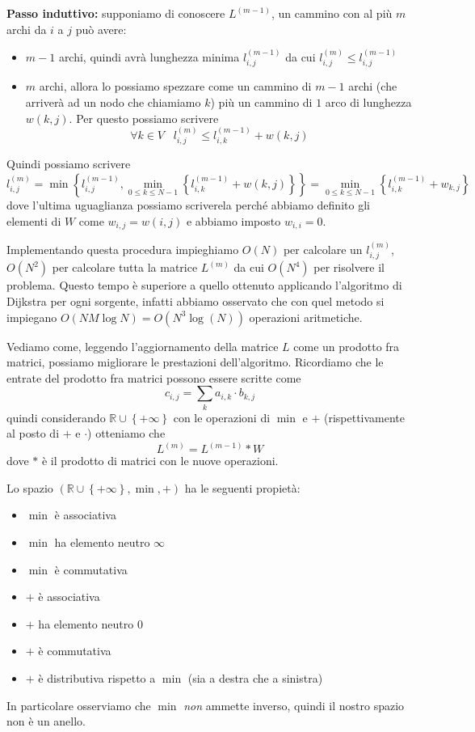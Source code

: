 \documentclass[a4paper,10pt]{amsbook}
\theoremstyle{plain}
\theoremstyle{definition}
\theoremstyle{remark}
\newcommand{\set}[1]{\left\{#1\right\}}
\newcommand{\pa}[1]{\left(#1\right)}
\begin{document}
\textbf{Passo induttivo:} supponiamo di conoscere $L^{(m-1)}$, un
cammino con al più $m$ archi da $i$ a $j$ può avere:
\begin{itemize}
\item $m-1$ archi, quindi avrà lunghezza minima $l^{(m-1)}
  _{i,j}$ da cui $l^{(m)}_{i,j} \le l^{(m-1)} _{i,j}$
\item $m$ archi, allora lo possiamo spezzare come un cammino di
  $m-1$ archi (che arriverà ad un nodo che chiamiamo $k$) più un
  cammino di $1$ arco di lunghezza $w\pa{k,j}$. Per questo possiamo
  scrivere 
  \[ \forall k \in V\;\;\; l^{(m)}_{i,j} \le l^{(m-1)} _{i,k} + w\pa{
    k,j } \]
\end{itemize}
Quindi possiamo scrivere
\[ l^{(m)}_{i,j} = \min\set{ l^{(m-1)} _{i,j} , \min _{0\le k\le N-1}
  \set{ l^{(m-1)} _{i,k} + w\pa{k,j}} } = \min _{0\le k\le N-1} \set{
  l^{(m-1)} _{i,k} + w_{k,j}} \]
dove l'ultima uguaglianza possiamo scriverela perché abbiamo definito
gli elementi di $W$ come $w_{i,j} = w\pa{i,j}$ e abbiamo imposto
$w_{i,i} = 0$.

Implementando questa procedura impieghiamo $O(N)$ per calcolare un
$l^{(m)}_{i,j}$, $O(N^2)$ per calcolare tutta la matrice $L^{(m)}$ da
cui $O(N^4)$ per risolvere il problema. Questo tempo è superiore a
quello ottenuto applicando l'algoritmo di Dijkstra per ogni sorgente,
infatti abbiamo osservato che con quel metodo si impiegano $O(NM\log
N) = O( N^3 \log (N) )$ operazioni aritmetiche.

Vediamo come, leggendo l'aggiornamento della matrice $L$ come un
prodotto fra matrici, possiamo migliorare le prestazioni
dell'algoritmo. Ricordiamo che le entrate del prodotto fra matrici
possono essere scritte come
\[ c_{i,j} = \sum _k a_{i,k} \cdot b_{k,j} \] quindi considerando
$\mathbb{R}\cup \set{+\infty}$ con le operazioni di $\min$ e $+$
(rispettivamente al posto di $+$ e $\cdot$) otteniamo che
\[ L^{(m)} = L^{(m-1)} * W \]
dove $*$ è il prodotto di matrici con le nuove operazioni.

Lo spazio $\pa{\mathbb{R}\cup \set{+\infty} ,\min,+}$ ha le seguenti
propietà:
\begin{itemize}
\item $\min$ è associativa
\item $\min$ ha elemento neutro $\infty$
\item $\min$ è commutativa
\item $+$ è associativa
\item $+$ ha elemento neutro $0$
\item $+$ è commutativa
\item $+$ è distributiva rispetto a $\min$ (sia a destra che a sinistra)
\end{itemize}
In particolare osserviamo che $\min$ \emph{non} ammette inverso,
quindi il nostro spazio non \`e un anello.
\end{document}
